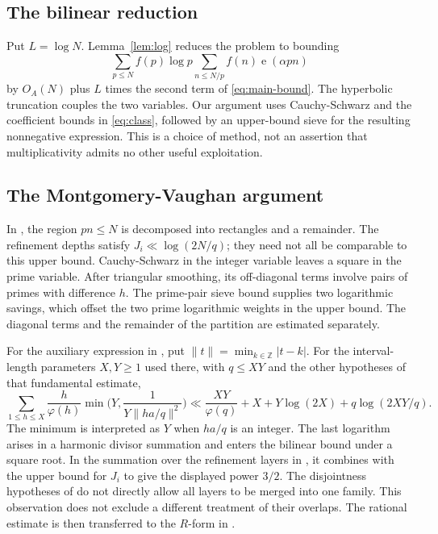 \documentclass[11pt]{amsart}
\numberwithin{equation}{section}
\numberwithin{figure}{section}
\theoremstyle{definition}
\newcommand{\Z}{\mathbb{Z}}
\newcommand{\e}{\operatorname{e}}
\begin{document}
\subsection{The bilinear reduction}
Put $L=\log N$. Lemma~\ref{lem:log} reduces the problem to bounding
\begin{equation}\label{eq:bilinear-shape}
 \sum_{p\le N}f(p)\log p\sum_{n\le N/p}f(n)\e(\alpha pn)
\end{equation}
by $O_A(N)$ plus $L$ times the second term of \eqref{eq:main-bound}.
The hyperbolic truncation couples the two variables. Our argument uses
Cauchy-Schwarz and the coefficient bounds in \eqref{eq:class}, followed
by an upper-bound sieve for the resulting nonnegative expression.
This is a choice of method, not an assertion that multiplicativity
admits no other useful exploitation.

\subsection{The Montgomery-Vaughan argument}
In \cite[Sections~3-5]{MV}, the region $pn\le N$ is decomposed into
rectangles and a remainder. The refinement depths satisfy
$J_i\ll\log(2N/q)$; they need not all be comparable to this upper bound.
Cauchy-Schwarz in the integer variable leaves a square in the prime
variable. After triangular smoothing, its off-diagonal terms involve
pairs of primes with difference $h$. The prime-pair sieve bound
supplies two logarithmic savings, which offset the two prime
logarithmic weights in the upper bound. The diagonal terms and the
remainder of the partition are estimated separately.

For the auxiliary expression in \cite[equations~(18)-(19)]{MV}, put
$\|t\|=\min_{k\in\Z}|t-k|$. For the interval-length parameters $X,Y\ge1$ used there, with
$q\le XY$ and the other hypotheses of that fundamental estimate,
\[
 \sum_{1\le h\le X}\frac h{\varphi(h)}
       \min\Big(Y,\frac1{Y\|ha/q\|^2}\Big)
 \ll \frac{XY}{\varphi(q)}+X+Y\log(2X)+q\log(2XY/q).
\]
The minimum is interpreted as $Y$ when $ha/q$ is an integer.
The last logarithm arises in a harmonic divisor summation and enters
the bilinear bound under a square root. In the summation over the
refinement layers in \cite[Section~5]{MV}, it combines with the upper
bound for $J_i$ to give the displayed power $3/2$. The disjointness
hypotheses of \cite[equation~(16)]{MV} do not directly allow all layers
to be merged into one family. This observation does not exclude a
different treatment of their overlaps. The rational estimate is then
transferred to the $R$-form in \cite[Section~6]{MV}.
\end{document}
